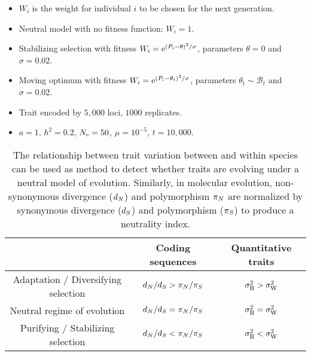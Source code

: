 \documentclass{article}
\begin{document}
\newpage

\begin{itemize}
    \item $W_i$ is the weight for individual $i$ to be chosen for the next generation.
    \item Neutral model with no fitness function: $W_i = 1$.
    \item Stabilizing selection with fitness $W_i = \text{e}^{(P_i - \theta)^2/ \sigma}$, parameters $\theta=0$ and $\sigma=0.02$.
    \item Moving optimum with fitness $W_i = \text{e}^{(P_i - \theta_t)^2/ \sigma}$, parameters $\theta_t \sim \mathcal{B}_t$ and $\sigma=0.02$.
\end{itemize}
\begin{itemize}
    \item Trait encoded by $5,000$ loci, $1000$ replicates.
    \item $a=1$, $h^2=0.2$, $N_{\text{e}}=50$, $\mu=10^{-5}$, $t=10,000$.
\end{itemize}

\begin{table*}[t!]
    \centering
    \begin{adjustbox}{width = 0.5\textwidth}
        \begin{tabular}{|c||c|c|}
            \hline
            & Coding sequences & Quantitative traits \\ \hline \hline
            Adaptation / Diversifying selection & $d_N / d_S > \pi_N / \pi_S$ & $ \sigma^2_{\mathrm{B}} > \sigma^2_{\mathrm{W}}  $ \\ \hline
            Neutral regime of evolution & $d_N / d_S = \pi_N / \pi_S$ & $ \sigma^2_{\mathrm{B}} = \sigma^2_{\mathrm{W}}  $ \\ \hline
            Purifying / Stabilizing selection & $d_N / d_S < \pi_N / \pi_S$ & $ \sigma^2_{\mathrm{B}} < \sigma^2_{\mathrm{W}}  $ \\ \hline
        \end{tabular}
    \end{adjustbox}
    \caption{
        The relationship between trait variation between and within species can be used as method to detect whether traits are evolving under a neutral model of evolution.
        Similarly, in molecular evolution, non-synonymous divergence ($d_N$) and polymorphism $\pi_N$ are normalized by synonymous divergence ($d_S$) and polymorphism ($\pi_S$) to produce a neutrality index\cite{mcdonald_adaptative_1991, fay_evaluating_2008}.
    }
    \label{table:dnds}
\end{table*}
\end{document}
